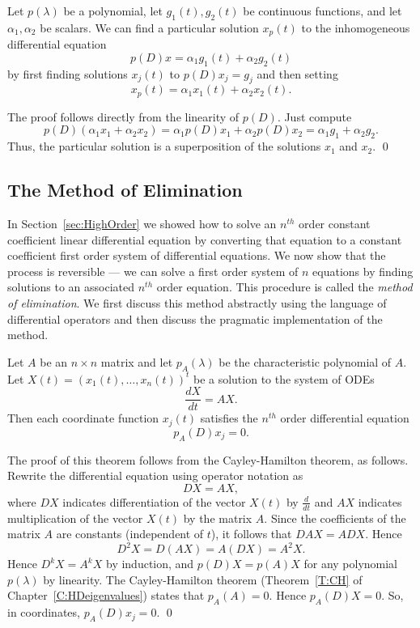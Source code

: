 \begin{lemma}  \label{L:inhsup}
Let $p(\lambda)$ be a polynomial, let $g_1(t),g_2(t)$ be continuous 
functions, and let $\alpha_1,\alpha_2$ be scalars.  We can find a particular 
solution $x_p(t)$ to the inhomogeneous differential equation
\[
p(D)x = \alpha_1g_1(t) + \alpha_2g_2(t)
\]
by first finding solutions $x_j(t)$ to $p(D)x_j = g_j$ and then setting 
\[
x_p(t) = \alpha_1x_1(t) + \alpha_2x_2(t).
\]
\end{lemma}

\proof  The proof follows directly from the linearity of $p(D)$.  Just 
compute
\[
p(D)(\alpha_1x_1 + \alpha_2x_2) = \alpha_1p(D)x_1 + 
\alpha_2p(D)x_2 = \alpha_1g_1 + \alpha_2g_2.
\]
Thus, the particular solution is a superposition of the solutions $x_1$ and
$x_2$.  \qed

\subsection*{The Method of Elimination}

In Section~\ref{sec:HighOrder} we showed how to solve an $n^{th}$ order 
constant coefficient linear differential equation by converting that equation 
to a constant coefficient first order system of differential equations.  We 
now show that the process is reversible --- we can solve a first order 
system of $n$ equations by finding solutions to an associated $n^{th}$ order 
equation.  This procedure is called the {\em method of elimination\/}.
  We first discuss this method abstractly using 
the language of differential operators and then discuss the pragmatic 
implementation of the method.

\begin{thm}  \label{T:Elimination}
Let $A$ be an $n\times n$ matrix and let $p_A(\lambda)$ be the characteristic 
polynomial of $A$.  Let $X(t)=(x_1(t),\ldots,x_n(t))^t$ be a solution to the 
system of ODEs 
\[
\frac{dX}{dt} = AX.
\]
Then each coordinate function $x_j(t)$ satisfies the $n^{th}$ order 
differential equation
\begin{equation}  \label{E:Elimination}
p_A(D)x_j = 0.
\end{equation}
\end{thm}

\proof  The proof of this theorem follows from the Cayley-Hamilton 
theorem, as follows.   Rewrite the differential equation using operator 
notation as  
\[
DX = AX,
\]
where $DX$ indicates differentiation of the vector $X(t)$ by $\frac{d}{dt}$ 
and $AX$ indicates multiplication of the vector $X(t)$ by the matrix $A$.
Since the coefficients of the matrix $A$ are constants (independent of $t$), 
it follows that $DAX=ADX$.  Hence
\[
D^2X = D(AX) = A(DX) = A^2X.
\]
Hence $D^kX = A^kX$ by induction, and $p(D)X = p(A)X$ for any polynomial $p(\lambda)$ by linearity.  The Cayley-Hamilton theorem (Theorem~\ref{T:CH} 
of Chapter~\ref{C:HDeigenvalues}) states that $p_A(A)=0$.  Hence $p_A(D)X=0$.  
So, in coordinates, $p_A(D)x_j=0$. \qed

